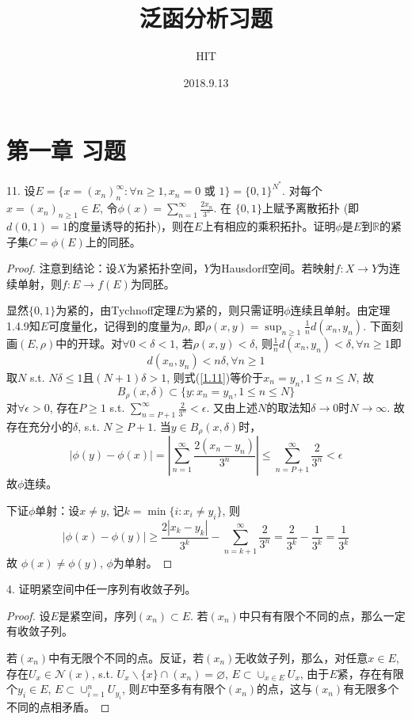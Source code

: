 \documentclass[a4paper,8pt]{ctexart}\textwidth 140mm \textheight 216mm
\title{泛函分析习题}
\author{HIT}
\date{2018.9.13}
\newcommand{\8}{\infty}
\begin{document}
\tableofcontents
\section{第一章 习题}
11. 设$E=\{x=(x_n)_n^{\infty}:\forall n\geq 1, x_n=0\text{ 或 }1\}=\{0,1\}^{N^*}$. 对每个$x=(x_n)_{n\geq 1}\in E$, 令$\phi(x)=\sum_{n=1}^{\infty}\frac{2x_n}{3^n}$. 在 $\{0,1\}$上赋予离散拓扑 (即$d(0,1)=1$的度量诱导的拓扑)，则在$E$上有相应的乘积拓扑。证明$\phi$是$E$到$\mathbb{R}$的紧子集$C=\phi(E)$上的同胚。
\begin{proof}
	注意到结论：设$X$为紧拓扑空间，$Y$为Hausdorff空间。若映射$f: X\to Y$为连续单射，则$f:E\to f(E)$为同胚。
	
	显然$\{0,1\}$为紧的，由Tychnoff定理$E$为紧的，则只需证明$\phi$连续且单射。由定理1.4.9知$E$可度量化，记得到的度量为$\rho$, 即$\rho(x,y)=\sup_{n\geq 1}\frac{1}{n}d(x_n,y_n)$. 下面刻画$(E,\rho)$中的开球。对$\forall 0<\delta<1$, 若$\rho(x,y)<\delta$, 则$\frac{1}{n}d(x_n,y_n)<\delta, \forall n\geq 1$即
	\begin{equation}\label{1.11}
	d(x_n,y_n)<n\delta,\forall n\geq 1\tag{*}
	\end{equation}
	取$N$ s.t. $N\delta \leq 1$且$(N+1)\delta>1$, 则式(\ref{1.11})等价于$x_n=y_n, 1\leq n\leq N$, 故
	$$B_\rho(x,\delta)\subset \{y: x_n=y_n, 1\leq n\leq N\}$$
	对$\forall \epsilon>0$, 存在$P\geq 1$ s.t. $\sum_{n=P+1}^\infty \frac{2}{3^n}<\epsilon$. 又由上述$N$的取法知$\delta\to 0$时$N\to\infty$. 故存在充分小的$\delta$, s.t. $N\geq P+1$. 当$y\in B_\rho(x,\delta)$时，
	$$|\phi(y)-\phi(x)|=|\sum_{n=1}^\infty \frac{2(x_n-y_n)}{3^n}|\leq \sum_{n=P+1}^{\infty}\frac{2}{3^n}<\epsilon$$
	故$\phi$连续。
	
	下证$\phi$单射：设$x\neq y$, 记$k=\min\{i:x_i\neq y_i\}$, 则
	\begin{equation*}
	|\phi(x)-\phi(y)|\geq \frac{2|x_k-y_k|}{3^k}-\sum_{n=k+1}^\infty\frac{2}{3^n}=\frac{2}{3^k}-\frac{1}{3^k}=\frac{1}{3^k}
	\end{equation*}
	故 $\phi(x)\neq \phi(y)$, $\phi$为单射。
\end{proof}


4. 证明紧空间中任一序列有收敛子列。
\begin{proof}
	设$E$是紧空间，序列$(x_n)\subset E$. 若$(x_n)$中只有有限个不同的点，那么一定有收敛子列。
	
	若$(x_n)$中有无限个不同的点。反证，若$(x_n)$无收敛子列，那么，对任意$x\in E$, 存在$U_x\in\mathcal{N}(x)$, s.t. $U_x\backslash\{x\}\cap (x_n)=\varnothing$, $E\subset\cup_{x\in E}U_x$, 由于$E$紧，存在有限个$y_i\in E$, $E\subset \cup_{i=1}^n U_{y_i}$, 则$E$中至多有有限个$(x_n)$的点，这与$(x_n)$有无限多个不同的点相矛盾。
\end{proof}
\end{document}
